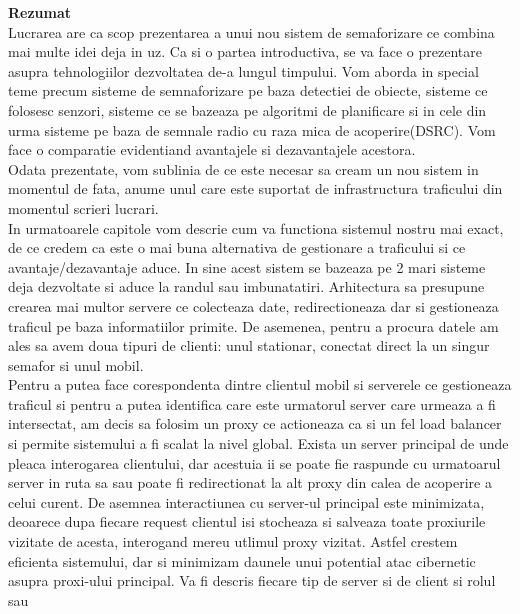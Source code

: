 \documentclass[17pt]{report}
\begin{document}
\pagebreak

{\Large\textbf{Rezumat}} \\

\indent \indent
Lucrarea are ca scop prezentarea a unui nou sistem de semaforizare 
ce combina mai multe idei deja in uz. Ca si o partea introductiva,
se va face o prezentare asupra tehnologiilor dezvoltatea de-a lungul 
timpului. Vom aborda in special teme precum sisteme de semnaforizare 
pe baza detectiei de obiecte, sisteme ce folosesc senzori, sisteme ce
se bazeaza pe algoritmi de planificare si in cele din urma sisteme
pe baza de semnale radio cu raza mica de acoperire(DSRC).
Vom face o comparatie evidentiand avantajele si dezavantajele acestora.\\
\indent \indent
Odata prezentate, vom sublinia de ce este necesar sa cream un nou 
sistem in momentul de fata, anume unul care este suportat de 
infrastructura traficului din momentul scrieri lucrari. \\
\indent \indent
In urmatoarele capitole vom descrie cum va functiona sistemul nostru mai
exact, de ce credem ca este o mai buna alternativa de gestionare a
traficului si ce avantaje/dezavantaje aduce. In sine 
acest sistem se bazeaza pe 2 mari sisteme deja dezvoltate si aduce 
la randul sau imbunatatiri. Arhitectura sa presupune crearea mai multor 
servere ce colecteaza date, redirectioneaza dar si gestioneaza traficul pe 
baza informatiilor primite. De asemenea, pentru a procura datele am 
ales sa avem doua tipuri de clienti: unul stationar, conectat direct 
la un singur semafor si unul mobil. \\
\indent \indent
Pentru a putea face corespondenta dintre clientul mobil si serverele 
ce gestioneaza traficul si pentru a putea identifica care este 
urmatorul server care urmeaza a fi intersectat, am decis sa folosim 
un proxy ce actioneaza ca si un fel load balancer si permite
sistemului a fi scalat la nivel global. Exista un server principal
de unde pleaca interogarea clientului, dar acestuia ii se poate fie raspunde cu 
urmatoarul server in ruta sa sau poate fi redirectionat la alt proxy 
din calea de acoperire a celui curent. De asemnea interactiunea cu server-ul
principal este minimizata, deoarece dupa fiecare request clientul isi stocheaza 
si salveaza toate proxiurile vizitate de acesta, interogand mereu utlimul 
proxy vizitat. Astfel crestem eficienta sistemului, 
dar si minimizam daunele unui potential atac cibernetic asupra 
proxi-ului principal. Va fi descris fiecare tip de server si de client si rolul sau 
\end{document}
